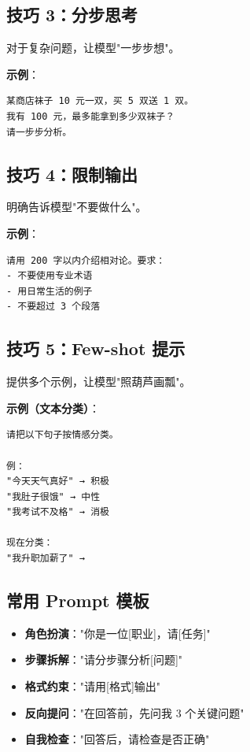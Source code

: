 \documentclass[12pt,UTF8]{ctexbook}
\begin{document}
\subsection{技巧 3：分步思考}

对于复杂问题，让模型"一步步想"。

\textbf{示例}：
\begin{verbatim}
某商店袜子 10 元一双，买 5 双送 1 双。
我有 100 元，最多能拿到多少双袜子？
请一步步分析。
\end{verbatim}

\subsection{技巧 4：限制输出}

明确告诉模型"不要做什么"。

\textbf{示例}：
\begin{verbatim}
请用 200 字以内介绍相对论。要求：
- 不要使用专业术语
- 用日常生活的例子
- 不要超过 3 个段落
\end{verbatim}

\subsection{技巧 5：Few-shot 提示}

提供多个示例，让模型"照葫芦画瓢"。

\textbf{示例（文本分类）}：
\begin{verbatim}
请把以下句子按情感分类。

例：
"今天天气真好" → 积极
"我肚子很饿" → 中性
"我考试不及格" → 消极

现在分类：
"我升职加薪了" →
\end{verbatim}

\subsection{常用 Prompt 模板}

\begin{itemize}
  \item \textbf{角色扮演}："你是一位[职业]，请[任务]"
  \item \textbf{步骤拆解}："请分步骤分析[问题]"
  \item \textbf{格式约束}："请用[格式]输出"
  \item \textbf{反向提问}："在回答前，先问我 3 个关键问题"
  \item \textbf{自我检查}："回答后，请检查是否正确"
\end{itemize}
\end{document}

